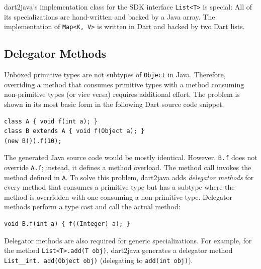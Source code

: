 \documentclass[sigplan]{acmart}
\begin{document}
dart2java's implementation class for the SDK interface \texttt{List<T>} is special: All of its specializations are hand-written and backed by a Java array. The implementation of \texttt{Map<K, V>} is written in Dart and backed by two Dart lists.

\subsection{Delegator Methods}
Unboxed primitive types are not subtypes of \texttt{Object} in Java. Therefore, overriding a method that consumes primitive types with a method consuming non-primitive types (or vice versa) requires additional effort. The problem is shown in its most basic form in the following Dart source code snippet.

\begin{mdframed}[outerlinewidth=0.1pt,outerlinecolor=black,skipabove=4pt,
  innerleftmargin=5pt,innerrightmargin=0pt,innertopmargin=0pt,innerbottommargin=0pt]
\begin{lstlisting}
class A { void f(int a); }
class B extends A { void f(Object a); }
(new B()).f(10);
\end{lstlisting}
\end{mdframed}
The generated Java source code would be mostly identical. However, \texttt{B.f} does not override \texttt{A.f}; instead, it defines a method overload. The method call invokes the method defined in \texttt{A}. To solve this problem, dart2java adds \emph{delegator methods} for every method that consumes a primitive type but has a subtype where the method is overridden with one consuming a non-primitive type. Delegator methods perform a type cast and call the actual method:
\begin{mdframed}[outerlinewidth=0.1pt,outerlinecolor=black,skipabove=4pt,
  innerleftmargin=5pt,innerrightmargin=0pt,innertopmargin=0pt,innerbottommargin=0pt]
\begin{lstlisting}
void B.f(int a) { f((Integer) a); }
\end{lstlisting}
\end{mdframed}
Delegator methods are also required for generic specializations. For example, for the method \texttt{List<T>.add(T obj)}, dart2java generates a delegator method \texttt{List\_\_int. add(Object obj)} (delegating to \texttt{add(int obj)}).
\end{document}
